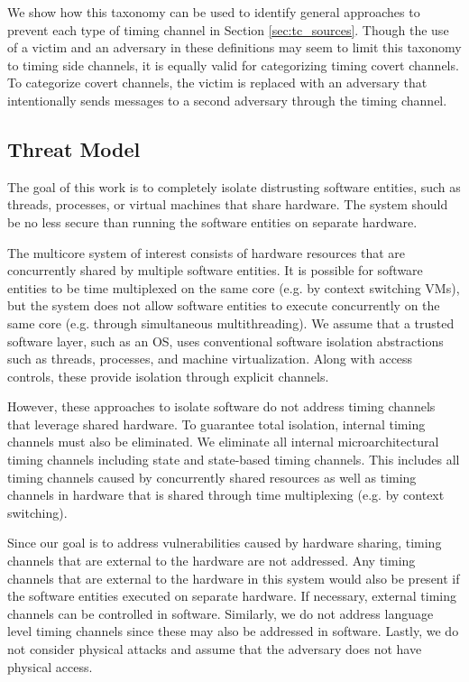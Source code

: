 We show how this taxonomy can be used to identify general approaches to prevent 
each type of timing channel in Section \ref{sec:tc_sources}. Though the use of 
a victim and an adversary in these definitions may seem to limit this taxonomy 
to timing side channels, it is equally valid for categorizing timing covert 
channels. To categorize covert channels, the victim is replaced with an 
adversary that intentionally sends messages to a second adversary through the 
timing channel.

\subsection{Threat Model}
The goal of this work is to completely isolate distrusting software entities, 
such as threads, processes, or virtual machines that share hardware. The system 
should be no less secure than running the software entities on separate 
hardware. 

The multicore system of interest consists of hardware resources that are
concurrently shared by multiple software entities. It is possible for software 
entities to be time multiplexed on the same core (e.g.  by context switching 
VMs), but the system does not allow software entities to execute concurrently 
on the same core (e.g. through simultaneous multithreading). 
We assume that a trusted software layer, such as an OS, uses conventional 
software isolation abstractions such as threads, processes, and machine 
virtualization. Along with access controls, these provide isolation through 
explicit channels.

However, these approaches to isolate software do not address timing channels 
that leverage shared hardware. To guarantee total isolation, internal timing 
channels must also be eliminated. We eliminate all internal microarchitectural 
timing channels including state and state-based timing channels. This includes 
all timing channels caused by concurrently shared resources as well as timing 
channels in hardware that is shared through time multiplexing (e.g. by context 
switching).

Since our goal is to address vulnerabilities 
caused by hardware sharing,
timing channels that are external to the hardware are not addressed.
Any timing channels that are external to the hardware in this system would also 
be present if the software entities executed on separate hardware. If 
necessary, external timing channels can be controlled in software. Similarly, 
we do not address language level timing channels since these may also be 
addressed in software.  Lastly, we do not consider physical attacks and assume 
that the adversary does not have physical access.
